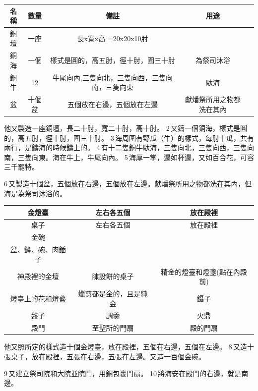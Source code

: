 
\begin{table}[H]
\centering
\begin{tabular}{c|c|c|c|c}\hline\hline
名稱      & 數量 & 備註 & 用途 \\\hline\hline
銅壇    & 一座  &  長x寬x高 =20x20x10肘 & \\\hline
銅海   &  一個 &樣式是圓的，高五肘，徑十肘，圍三十肘          &為祭司沐浴  \\\hline
銅牛  & 12  & 牛尾向內,三隻向北，三隻向西，三隻向南，三隻向東& 馱海 \\\hline
盆&十個盆&五個放在右邊，五個放在左邊&獻燔祭所用之物都洗在其內\\\hline
\end{tabular}
\end{table}
他又製造一座銅壇，長二十肘，寬二十肘，高十肘。 2 又鑄一個銅海，樣式是圓的，高五肘，徑十肘，圍三十肘。 3 海周圍有野瓜（牛）的樣式，每肘十瓜，共有兩行，是鑄海的時候鑄上的。 4 有十二隻銅牛馱海，三隻向北，三隻向西，三隻向南，三隻向東。海在牛上，牛尾向內。 5 海厚一掌，邊如杯邊，又如百合花，可容三千罷特。

6 又製造十個盆，五個放在右邊，五個放在左邊。獻燔祭所用之物都洗在其內，但海是為祭司沐浴的。


\begin{table}[H]
\centering 
\begin{tabular}{c|c|c}\hline\hline
金燈臺&左右各五個&放在殿裡\\\hline
桌子&左右各五個&放在殿裡\\\hline
金碗&&\\\hline
盆、鏟、碗、肉鍤子&&\\\hline
神殿裡的金壇    & 陳設餅的桌子  &  精金的燈臺和燈盞(點在內殿前)\\\hline
燈臺上的花和燈盞   &  蠟剪都是金的，且是純金 &鑷子     \\\hline
盤子&調羹&火鼎    \\\hline
殿門&至聖所的門扇&殿的門扇  \\\hline
\end{tabular}
\end{table}
他又照所定的樣式造十個金燈臺，放在殿裡，五個在右邊，五個在左邊。 8 又造十張桌子，放在殿裡，五張在右邊，五張在左邊。又造一百個金碗。

9 又建立祭司院和大院並院門，用銅包裹門扇。 10 將海安在殿門的右邊，就是南邊。

